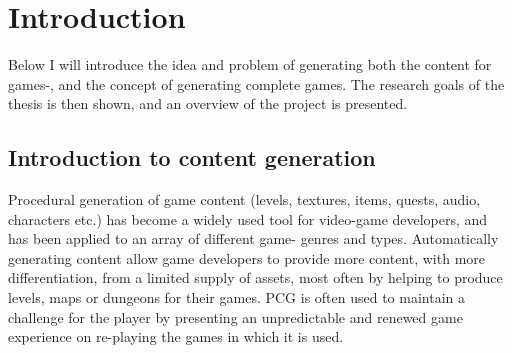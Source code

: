 \documentclass[a4paper,titlepage,final]{report}
\begin{document}



\tableofcontents
\newpage


\chapter{Introduction}
Below I will introduce the idea and problem of generating both the content for games-, and the concept of generating complete games.
The research goals of the thesis is then shown, and an overview of the project is presented.

\section{Introduction to content generation}
\label{sec_introtocontentgen}

Procedural generation of game content (levels, textures, items, quests, audio, characters etc.) has become a widely used tool for video-game developers, and has been applied to an array of different game- genres and types.
Automatically generating content allow game developers to provide more content, with more differentiation, from a limited supply of assets, most often by helping to produce levels, maps or dungeons for their games. 
PCG is often used to maintain a challenge for the player by presenting an unpredictable and renewed game experience on re-playing the games in which it is used.
\end{document}
